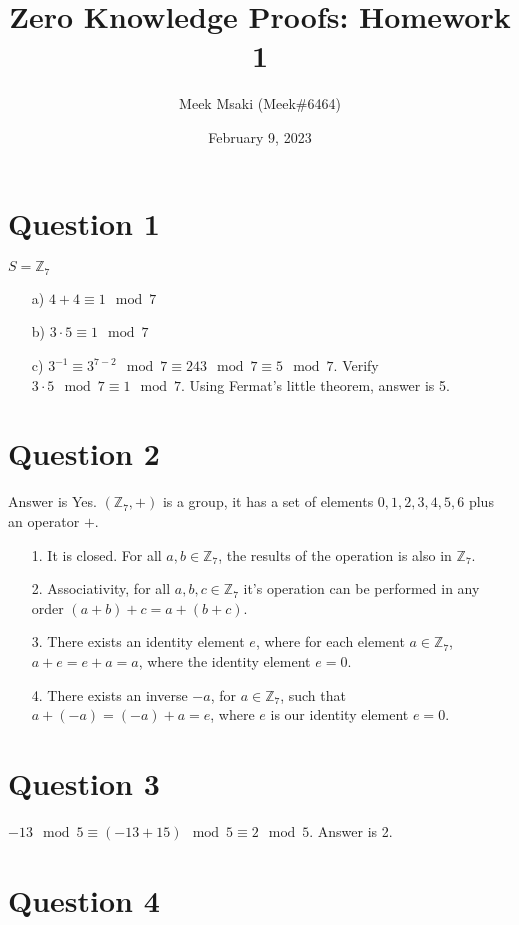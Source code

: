 \documentclass{article}
\title{Zero Knowledge Proofs: Homework 1}
\author{Meek Msaki (Meek\#6464)}
\date{February 9, 2023}
\begin{document}
\maketitle

\section*{Question 1}
$S=\mathbb{Z}_7$
\begin{itemize}
    \item[a)] $4+4 \equiv 1 \mod 7$
    \item[b)] $3\cdot5 \equiv 1 \mod 7$
    \item[c)] $3^{-1} \equiv 3^{7-2} \mod 7 \equiv 243 \mod 7 \equiv 5 \mod 7$. Verify $3\cdot5 \mod7 \equiv 1 \mod 7$. Using Fermat's little theorem, answer is 5.
\end{itemize}

\section*{Question 2}
Answer is Yes. $(\mathbb{Z}_7, +)$ is a group, it has a set of elements ${0,1,2,3,4,5,6}$ plus an operator $+$. 

\begin{itemize}
    \item[1.]It is closed. For all $a,b \in \mathbb Z_7$, the results of the operation is also in $\mathbb Z_7$.
    \item[2.]Associativity, for all $a,b,c \in \mathbb Z_7$ it's operation can be performed in any order $(a+b)+c=a+(b+c)$.
    \item[3.]There exists an identity element $e$, where for each element $a\in \mathbb{Z}_7$, $a+e=e+a=a$, where the identity element $e=0$.
    \item[4.]There exists an inverse $-a$, for $a \in \mathbb Z_7$, such that $a+(-a)=(-a)+a=e$, where $e$ is our identity element $e=0$.
\end{itemize} 

\section*{Question 3}
$-13 \mod 5 \equiv (-13 + 15 )\mod 5  \equiv 2 \mod 5$. Answer is 2.

\section*{Question 4}
\end{document}
